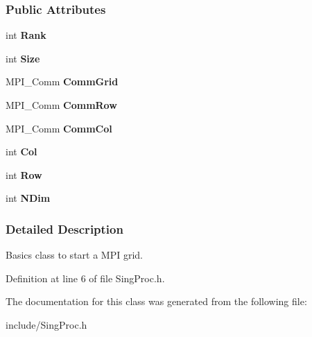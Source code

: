 \subsubsection*{\-Public \-Attributes}
\begin{DoxyCompactItemize}
\item 
\hypertarget{classSingProc_aa8e7eb314f63a9383edcce8e38694e90}{int {\bfseries \-Rank}}\label{classSingProc_aa8e7eb314f63a9383edcce8e38694e90}

\item 
\hypertarget{classSingProc_af06eb7b9b70be91dadd4f12ebcaed796}{int {\bfseries \-Size}}\label{classSingProc_af06eb7b9b70be91dadd4f12ebcaed796}

\item 
\hypertarget{classSingProc_a82958d6e31776bbd7372475bad0a9f09}{\-M\-P\-I\-\_\-\-Comm {\bfseries \-Comm\-Grid}}\label{classSingProc_a82958d6e31776bbd7372475bad0a9f09}

\item 
\hypertarget{classSingProc_ae3301d00b08296cfab4ad4301bda81fa}{\-M\-P\-I\-\_\-\-Comm {\bfseries \-Comm\-Row}}\label{classSingProc_ae3301d00b08296cfab4ad4301bda81fa}

\item 
\hypertarget{classSingProc_a3cc77c5d3c39f52babcd8b280a934833}{\-M\-P\-I\-\_\-\-Comm {\bfseries \-Comm\-Col}}\label{classSingProc_a3cc77c5d3c39f52babcd8b280a934833}

\item 
\hypertarget{classSingProc_a17362b2621c297f5be786e321d787063}{int {\bfseries \-Col}}\label{classSingProc_a17362b2621c297f5be786e321d787063}

\item 
\hypertarget{classSingProc_a389e27ee83b4a5d0eec4e321f4b2fe38}{int {\bfseries \-Row}}\label{classSingProc_a389e27ee83b4a5d0eec4e321f4b2fe38}

\item 
\hypertarget{classSingProc_a3b5e7568c0a268ec8bbeef7f29ea111a}{int {\bfseries \-N\-Dim}}\label{classSingProc_a3b5e7568c0a268ec8bbeef7f29ea111a}

\end{DoxyCompactItemize}


\subsubsection{\-Detailed \-Description}
\-Basics class to start a \-M\-P\-I grid. 

\-Definition at line 6 of file \-Sing\-Proc.\-h.



\-The documentation for this class was generated from the following file\-:\begin{DoxyCompactItemize}
\item 
include/\-Sing\-Proc.\-h\end{DoxyCompactItemize}
